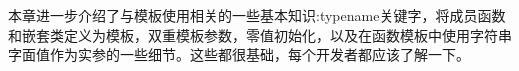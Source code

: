 本章进一步介绍了与模板使用相关的一些基本知识:typename关键字，将成员函数和嵌套类定义为模板，双重模板参数，零值初始化，以及在函数模板中使用字符串字面值作为实参的一些细节。这些都很基础，每个开发者都应该了解一下。